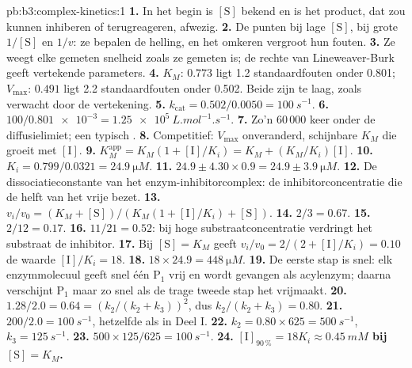 \begin{solution}{pb:b3:complex-kinetics:1}
\textbf{1.} In het begin is $[\mathrm S]$ bekend en is het product, dat zou
kunnen inhiberen of terugreageren, afwezig.
\textbf{2.} De punten bij lage $[\mathrm S]$, bij grote $1/[\mathrm S]$ en
$1/v$: ze bepalen de helling, en het omkeren vergroot hun fouten.
\textbf{3.} Ze weegt elke gemeten snelheid zoals ze gemeten is; de rechte
van Lineweaver-Burk geeft vertekende parameters.
\textbf{4.} $K_M$: $0.773$ ligt 1.2 standaardfouten onder 0.801; $V_{\max}$:
$0.491$ ligt 2.2 standaardfouten onder 0.502. Beide zijn te laag, zoals
verwacht door de vertekening.
\textbf{5.} $k_{\mathrm{cat}} = 0.502/0.0050 = \qty{100}{s^{-1}}$.
\textbf{6.} $100/\num{0.801e-3} = \qty{1.25e5}{L.mol^{-1}.s^{-1}}$.
\textbf{7.} Zo'n 60\,000 keer onder de diffusielimiet; een typisch .
\textbf{8.} Competitief: $V_{\max}$ onveranderd, schijnbare $K_M$ die groeit met $[\mathrm I]$.
\textbf{9.} $K_M^{\mathrm{app}} = K_M(1 + [\mathrm I]/K_i) = K_M + (K_M/K_i)[\mathrm I]$.
\textbf{10.} $K_i = 0.799/0.0321 = \qty{24.9}{\micro M}$.
\textbf{11.} $24.9 \pm 4.30 \times 0.9 = 24.9 \pm \qty{3.9}{\micro M}$.
\textbf{12.} De dissociatieconstante van het enzym-inhibitorcomplex: de
inhibitorconcentratie die de helft van het vrije  bezet.
\textbf{13.} $v_i/v_0 = (K_M + [\mathrm S])/(K_M(1 + [\mathrm I]/K_i) + [\mathrm S])$.
\textbf{14.} $2/3 = 0.67$.
\textbf{15.} $2/12 = 0.17$.
\textbf{16.} $11/21 = 0.52$: bij hoge substraatconcentratie verdringt het
substraat de inhibitor.
\textbf{17.} Bij $[\mathrm S] = K_M$ geeft $v_i/v_0 = 2/(2 + [\mathrm I]/K_i) = 0.10$ de waarde $[\mathrm I]/K_i = 18$.
\textbf{18.} $18 \times 24.9 = \qty{448}{\micro M}$.
\textbf{19.} De eerste stap is snel: elk enzymmolecuul geeft snel één
$\mathrm P_1$ vrij en wordt gevangen als acylenzym; daarna verschijnt
$\mathrm P_1$ maar zo snel als de trage tweede stap het  vrijmaakt.
\textbf{20.} $1.28/2.0 = 0.64 = (k_2/(k_2 + k_3))^2$, dus $k_2/(k_2 + k_3) = 0.80$.
\textbf{21.} $200/2.0 = \qty{100}{s^{-1}}$, hetzelfde als in Deel I.
\textbf{22.} $k_2 = 0.80 \times 625 = \qty{500}{s^{-1}}$, $k_3 = \qty{125}{s^{-1}}$.
\textbf{23.} $500 \times 125/625 = \qty{100}{s^{-1}}$.
\textbf{24.} \textbf{$[\mathrm I]_{90\,\%} = 18K_i \approx \qty{0.45}{mM}$ bij $[\mathrm S] = K_M$.}
\end{solution}
